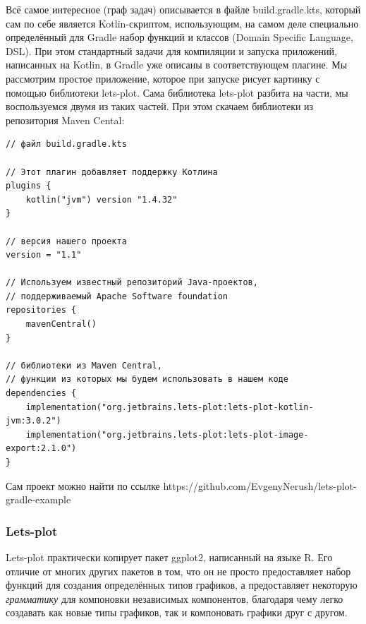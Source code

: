 \documentclass{book}
\begin{document}
Всё самое интересное (граф задач) описывается в файле build.gradle.kts, который сам по себе
является Kotlin-скриптом, использующим, на самом деле специально определённый для Gradle набор
функций и классов (Domain Specific Language, DSL). При этом стандартный задачи для компиляции и
запуска приложений, написанных на Kotlin, в Gradle уже описаны в соответствующем плагине.  Мы
рассмотрим простое приложение, которое при запуске рисует картинку с помощью библиотеки lets-plot.
Сама библиотека lets-plot разбита на части, мы воспользуемся двумя из таких частей. При этом
скачаем библиотеки из репозитория Maven Cental:
\begin{verbatim}
// файл build.gradle.kts

// Этот плагин добавляет поддержку Котлина
plugins {
    kotlin("jvm") version "1.4.32"
}

// версия нашего проекта
version = "1.1"

// Используем известный репозиторий Java-проектов,
// поддерживаемый Apache Software foundation
repositories {
    mavenCentral()
}

// библиотеки из Maven Central,
// функции из которых мы будем использовать в нашем коде
dependencies {
    implementation("org.jetbrains.lets-plot:lets-plot-kotlin-jvm:3.0.2")
    implementation("org.jetbrains.lets-plot:lets-plot-image-export:2.1.0")
}
\end{verbatim}
Сам проект можно найти по ссылке https://github.com/EvgenyNerush/lets-plot-gradle-example

\subsubsection{Lets-plot}

Lets-plot практически копирует пакет ggplot2, написанный на языке R. Его отличие от многих других
пакетов в том, что он не просто предоставляет набор функций для создания определённых типов
графиков, а предоставляет некоторую \textit{грамматику} для компоновки независимых компонентов,
благодаря чему легко создавать как новые типы графиков, так и компоновать графики друг с другом.
\end{document}

